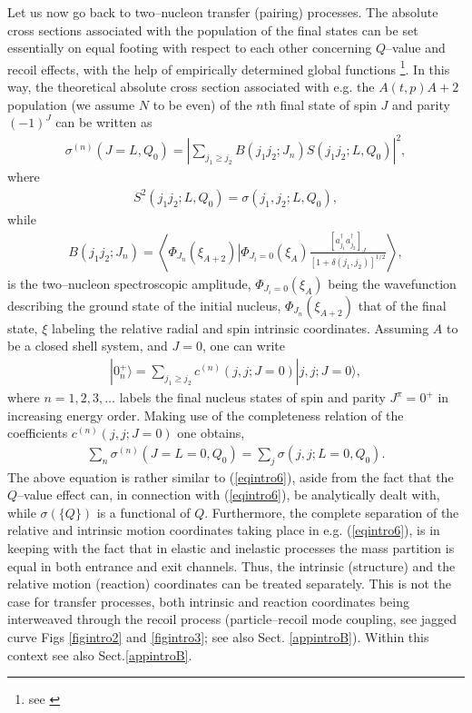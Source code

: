 Let us now go back to two--nucleon transfer (pairing) processes. The  absolute cross sections associated with the population of the final states can be set essentially on equal footing with respect to each other  concerning  $Q$--value and recoil effects, with the help of empirically determined global functions \footnote{see \cite{Broglia:72b}}. In this way, the theoretical absolute cross section associated with e.g. the $A(t,p)A+2$ population (we assume $N$ to be even) of the $n$th final state of spin $J$ and parity $(-1)^J$ can be written as 
\begin{align}
\sigma^{(n)}(J=L,Q_0)=\left|\sum_{j_1\geq j_2}B(j_1 j_2;J_n)S(j_1 j_2 ;L,Q_0)\right|^2,
\end{align}
where
\begin{align}
S^2(j_1 j_2 ;L,Q_0)=\sigma(j_1,j_2;L,Q_0),
\end{align}
while
\begin{align}
B(j_1j_2;J_n)=\left\langle \Phi_{J_n}(\xi_{A+2})\left|\Phi_{J_i=0}(\xi_A)\right.\frac{\left[a^\dagger_{j_1}a^\dagger_{j_2}\right]_J}{\left[1+\delta(j_1,j_2)\right]^{1/2}}\right\rangle,
\end{align}
is the two--nucleon spectroscopic amplitude, $\Phi_{J_i=0}(\xi_A)$ being the wavefunction describing the ground state of the initial nucleus, $\Phi_{J_n}(\xi_{A+2})$ that of the final state, $\xi$ labeling the relative radial and spin intrinsic coordinates. Assuming $A$ to be a closed shell system, and $J=0$, one can write
\begin{align}
|0^+_n\rangle=\sum_{j_1\geq j_2}c^{(n)}(j,j;J=0)|j,j;J=0\rangle,
\end{align}
where $n=1,2,3,\dots$ labels the final nucleus states of spin and parity $J^\pi=0^+$ in increasing energy order. Making use of the completeness relation of the coefficients $c^{(n)}(j,j;J=0)$ one obtains,
\begin{align}\label{eqintro12}
\sum_n \sigma^{(n)}(J=L=0,Q_0)=\sum_j\sigma(j,j;L=0,Q_0).
\end{align}
The above equation is rather similar to (\ref{eqintro6}), aside from the fact that the $Q$--value effect can, in connection with (\ref{eqintro6}),  be analytically dealt with, while $\sigma(\{Q\})$ is a functional of $Q$. Furthermore, the complete separation of the relative and intrinsic motion coordinates taking place in e.g. (\ref{eqintro6}), is in keeping with the fact that in elastic and inelastic processes the mass partition is equal in both entrance and exit channels. Thus, the intrinsic (structure) and the relative motion (reaction) coordinates can be treated separately. This is not the case for transfer processes, both intrinsic and reaction coordinates being interweaved through the recoil process (particle--recoil mode coupling, see jagged curve Figs \ref{figintro2} and \ref{figintro3}; see also Sect. \ref{appintroB}). Within this context see also Sect.\ref{appintroB}.





